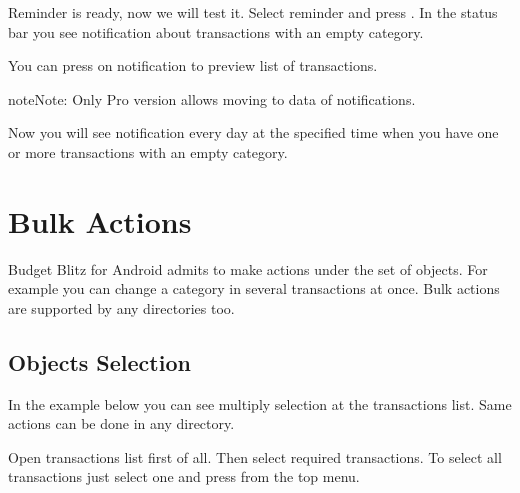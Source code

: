 \documentclass[a4paper,10pt,english]{sphinxmanual}
\begin{document}
\sphinxAtStartPar
Reminder is ready, now we will test it. Select reminder and press .
In the status bar you see notification about transactions with an empty category.

\noindent{}
\noindent{}
\noindent{}

\sphinxAtStartPar
You can press on notification to preview list of transactions.

\begin{sphinxadmonition}{note}{Note:}
\sphinxAtStartPar
Only Pro version allows moving to data of notifications.
\end{sphinxadmonition}

\sphinxAtStartPar
Now you will see notification every day at the specified time when
you have one or more transactions with an empty category.

\sphinxstepscope


\chapter{Bulk Actions}
\label{\detokenize{bulk-actions:bulk-actions}}\label{\detokenize{bulk-actions:chapter-bulk-actions}}\label{\detokenize{bulk-actions::doc}}
\sphinxAtStartPar
Budget Blitz for Android admits to make actions under the set of objects. For example you can change a category
in several transactions at once. Bulk actions are supported by any directories too.


\section{Objects Selection}
\label{\detokenize{bulk-actions:objects-selection}}
\sphinxAtStartPar
In the example below you can see multiply selection at the transactions list. Same actions can be done in
any directory.

\noindent{}
\noindent{}
\noindent{}

\sphinxAtStartPar
Open transactions list first of all. Then select required transactions.
To select all transactions just select one and press  from the top menu.
\end{document}
